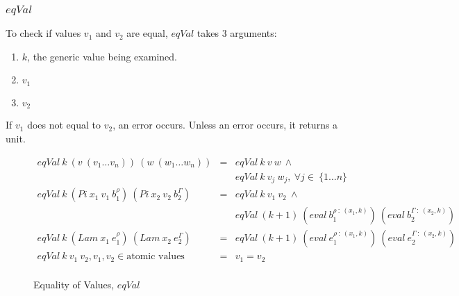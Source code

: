 \subsubsection{$eqVal$}

To check if values $v_1$ and $v_2$ are equal, $eqVal$ takes 3 arguments:

\begin{enumerate}
  \item $k$, the generic value being examined.
  \item $v_1$
  \item $v_2$
\end{enumerate}

If $v_1$ does not equal to $v_2$, an error occurs. Unless an error occurs, it returns a unit.

\begin{figure}[H]
  \begin{equation*}
    \begin{aligned}
      eqVal \: k \: (v \: (v_1 \dots v_n)) \: (w \: (w_1 \dots w_n))                       & = & eqVal \: k \:v \: w \: \land                                                                     \\
                                                                                           &   & eqVal \: k \: v_j \: w_j, \: \forall j \in \: \{1 \dots n\}                                      \\
      eqVal \: k \: (Pi \: x_1 \: v_1 \: b_1^{\rho}) \: (Pi \: x_2 \: v_2 \: b_2^{\Gamma}) & = & eqVal \: k \: v_1 \: v_2 \: \land                                                                \\
                                                                                           &   & eqVal \: (k+1) \: (eval \: b_1^{\rho \: : \: (x_1,k)}) \: (eval \: b_2^{\Gamma \: : \: (x_2,k)}) \\
      eqVal \: k \: (Lam \: x_1 \: e_1^{\rho}) \: (Lam \: x_2 \: e_2^{\Gamma})             & = & eqVal \: (k+1) \: (eval \: e_1^{\rho \: : \: (x_1,k)}) \: (eval \: e_2^{\Gamma \: : \: (x_2,k)}) \\
      eqVal \: k \: v_1 \: v_2, v_1,v_2 \in \textrm{atomic values}                         & = & v_1 = v_2                                                                                        \\
    \end{aligned}
  \end{equation*}
  \caption{Equality of Values, $eqVal$}
\end{figure}


